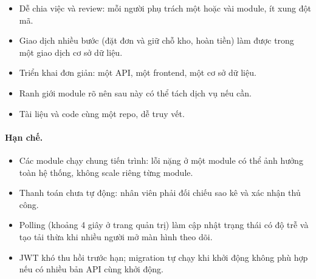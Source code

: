 \begin{itemize}
  \item Dễ chia việc và review: mỗi người phụ trách một hoặc vài module, ít xung đột mã.
  \item Giao dịch nhiều bước (đặt đơn và giữ chỗ kho, hoàn tiền) làm được trong một giao dịch cơ sở dữ liệu.
  \item Triển khai đơn giản: một API, một frontend, một cơ sở dữ liệu.
  \item Ranh giới module rõ nên sau này có thể tách dịch vụ nếu cần.
  \item Tài liệu và code cùng một repo, dễ truy vết.
\end{itemize}

\paragraph{Hạn chế.}

\begin{itemize}
  \item Các module chạy chung tiến trình: lỗi nặng ở một module có thể ảnh hưởng toàn hệ thống, không scale riêng từng module.
  \item Thanh toán chưa tự động: nhân viên phải đối chiếu sao kê và xác nhận thủ công.
  \item Polling (khoảng 4 giây ở trang quản trị) làm cập nhật trạng thái có độ trễ và tạo tải thừa khi nhiều người mở màn hình theo dõi.
  \item JWT khó thu hồi trước hạn; migration tự chạy khi khởi động không phù hợp nếu có nhiều bản API cùng khởi động.
\end{itemize}

